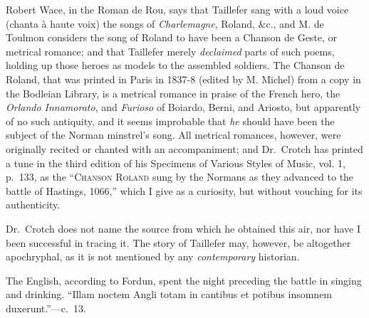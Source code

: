 \renewcommand\rectoheader{normans.---battle of hastings.}



Robert Wace, in the Roman de Rou, says that Taillefer sang with a loud voice 
(chanta à haute voix) the songs of \textit{Charlemagne}, Roland, \&c., and M. de
Toulmon considers the song of Roland to have been a Chanson de Geste, or
metrical romance; and that Taillefer merely \textit{declaimed} parts of such poems, holding
up those heroes as models to the assembled soldiers. The Chanson de Roland,
that was printed in Paris in 1837-8 (edited by M. Michel) from a copy in the
Bodleian Library, is a metrical romance in praise of the French hero, the \textit{Orlando
Innamorato}, and \textit{Furioso} of Boiardo, Berni, and Ariosto, but apparently of no such
antiquity, %
and it seems improbable that \textit{he} should have been the subject of the
Norman minstrel's song. All metrical romances, however, were originally recited
or chanted with an accompaniment; and Dr.~Crotch has printed a tune in the
third edition of his Specimens of Various Styles of Music, vol. 1, p.~133, as the
“\textsc{Chanson Roland} sung by the Normans as they advanced to the battle of
Hastings, 1066,” which I give as a curiosity, but without vouching for its
authenticity.


\smallskip

Dr.~Crotch does not name the source from which he obtained this air, nor
have I been successful in tracing it. %
The story of Taillefer may, however, be
altogether apochryphal, as it is not mentioned by any \textit{contemporary} historian.



The English, according to Fordun, \pagebreak 
spent the night preceding the battle in 
singing and drinking. “Illam noctem Angli totam in cantibus et potibus 
insomnem duxerunt.”—c.~13.

